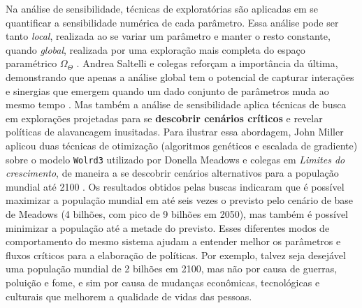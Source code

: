 \documentclass[./main.tex]{subfiles}
\begin{document}
\par Na análise de sensibilidade, técnicas de exploratórias são aplicadas em se quantificar a sensibilidade numérica de cada parâmetro. Essa análise pode ser tanto \textit{local}, realizada ao se variar um parâmetro e manter o resto constante, quando \textit{global}, realizada por uma exploração mais completa do espaço paramétrico $\Omega_{\Theta}$ \cite{Saltelli2006}. Andrea Saltelli e colegas reforçam a importância da última, demonstrando que apenas a análise global tem o potencial de capturar interações e sinergias que emergem quando um dado conjunto de parâmetros muda ao mesmo tempo \cite{Saltelli2019}.  Mas também a análise de sensibilidade aplica técnicas de busca em explorações projetadas para se \textbf{descobrir cenários críticos} e revelar políticas de alavancagem inusitadas. Para ilustrar essa abordagem, John Miller aplicou duas técnicas de otimização (algoritmos genéticos e escalada de gradiente) sobre o modelo \texttt{Wolrd3} utilizado por Donella Meadows e colegas em \textit{Limites do crescimento}, de maneira a se descobrir cenários alternativos para a população mundial até 2100 \cite{miller1998}. Os resultados obtidos pelas buscas indicaram que é possível maximizar a população mundial em até seis vezes o previsto pelo cenário de base de Meadows (4 bilhões, com pico de 9 bilhões em 2050), mas também é possível minimizar a população até a metade do previsto. Esses diferentes modos de comportamento do mesmo sistema ajudam a entender melhor os parâmetros e fluxos críticos para a elaboração de políticas. Por exemplo, talvez seja desejável uma população mundial de 2 bilhões em 2100, mas não por causa de guerras, poluição e fome, e sim por causa de mudanças econômicas, tecnológicas e culturais que melhorem a qualidade de vidas das pessoas. 
\end{document}

